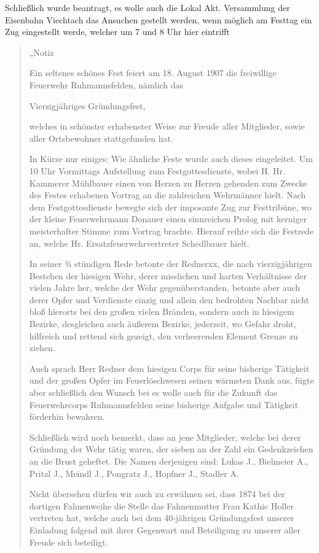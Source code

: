 \documentclass[12pt,a4paper]{book}
\begin{document}
\begin{itemize}
Schließlich wurde beantragt, es wolle auch die Lokal Akt. Versammlung
der Eisenbahn Viechtach das Ansuchen gestellt werden, wenn möglich am
Festtag ein Zug eingestellt werde, welcher um 7 und 8 Uhr hier eintrifft

\begin{quote}
„Notiz

Ein seltenes schönes Fest feiert am 18. August 1907 die freiwillige
Feuerwehr Ruhmannsfelden, nämlich das

Vierzigjähriges Gründungsfest,

welches in schönster erhabenster Weise zur Freude aller Mitglieder,
sowie aller Ortsbewohner stattgefunden hat.

In Kürze nur einiges: Wie ähnliche Feste wurde auch dieses eingeleitet.
Um 10 Uhr Vormittags Aufstellung zum Festgottesdienste, wobei H. Hr.
Kammerer Mühlbauer einen von Herzen zu Herzen gehenden zum Zwecke des
Festes erhabenen Vortrag an die zahlreichen Wehrmänner hielt. Nach dem
Festgottesdienste bewegte sich der imposante Zug zur Festtribüne, wo der
kleine Feuerwehrmann Donauer einen sinnreichen Prolog mit kerniger
meisterhafter Stimme zum Vortrag brachte. Hierauf reihte sich die
Festrede an, welche Hr. Ersatzfeuerwehrvertreter Schedlbauer hielt.

In seiner ¾ stündigen Rede betonte der Rednerxx, die nach
vierzigjährigen Bestehen der hiesigen Wehr, derer misslichen und harten
Verhältnisse der vielen Jahre her, welche der Wehr gegenüberstanden,
betonte aber auch derer Opfer und Verdienste einzig und allein den
bedrohten Nachbar nicht bloß hierorts bei den großen vielen Bränden,
sondern auch in hiesigem Bezirke, desgleichen auch äußerem Bezirke,
jederzeit, wo Gefahr droht, hilfreich und rettend sich gezeigt, den
verheerenden Element Grenze zu ziehen.

Auch sprach Herr Redner dem hiesigen Corps für seine bisherige Tätigkeit
und der großen Opfer im Feuerlöschwesen seinen wärmsten Dank aus, fügte
aber schließlich den Wunsch bei es wolle auch für die Zukunft das
Feuerwehrcorps Ruhmannsfelden seine bisherige Aufgabe und Tätigkeit
förderhin bewahren.

Schließlich wird noch bemerkt, dass an jene Mitglieder, welche bei derer
Gründung der Wehr tätig waren, der sieben an der Zahl ein Gedenkzeichen
an die Brust geheftet. Die Namen derjenigen sind: Lukas J., Bielmeier
A., Pritzl J., Meindl J., Pongratz J., Hopfner J., Stadler A.

Nicht übersehen dürfen wir auch zu erwähnen sei, dass 1874 bei der
dortigen Fahnenweihe die Stelle das Fahnenmutter Frau Kathie Holler
vertreten hat, welche auch bei dem 40-jährigen Gründungsfest unserer
Einladung folgend mit ihrer Gegenwart und Beteiligung zu unserer aller
Freude sich beteiligt.


\end{quote}
\end{itemize}
\end{document}
